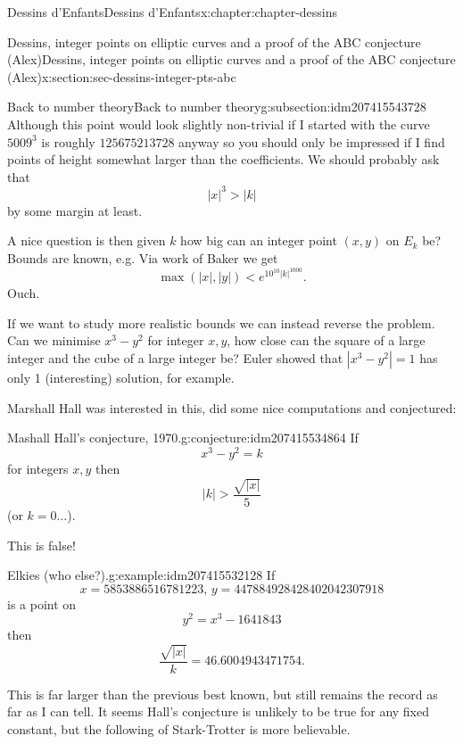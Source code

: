 \documentclass[oneside,10pt,]{book}
\numberwithin{equation}{section}
\newcommand{\lt}{<}
\newcommand{\gt}{>}
\begin{document}
\begin{chapterptx}{Dessins d'Enfants}{}{Dessins d'Enfants}{}{}{x:chapter:chapter-dessins}
\begin{sectionptx}{Dessins, integer points on elliptic curves and a proof of the ABC conjecture (Alex)}{}{Dessins, integer points on elliptic curves and a proof of the ABC conjecture (Alex)}{}{}{x:section:sec-dessins-integer-pts-abc}
\begin{subsectionptx}{Back to number theory}{}{Back to number theory}{}{}{g:subsection:idm207415543728}
Although this point would look slightly non-trivial if I started with the curve \(5009^3\) is roughly \(125675213728\) anyway so you should only be impressed if I find points of height somewhat larger than the coefficients. We should probably ask that%
\begin{equation*}
|x|^3 \gt |k|
\end{equation*}
by some margin at least.%
\par
A nice question is then given \(k\) how big can an integer point \((x,y)\) on \(E_k\) be? Bounds are known, e.g.  Via work of Baker we get%
\begin{equation*}
\max(|x|, |y|) \lt e^{10^{10}|k|^{1000}}\text{.}
\end{equation*}
Ouch.%
\par
If we want to study more realistic bounds we can instead reverse the problem. Can we minimise \(x^3 - y^2\) for integer \(x,y\), how close can the square of a large integer and the cube of a large integer be? Euler showed that \(|x^3 - y^2| = 1\) has only 1 (interesting) solution, for example.%
\par
Marshall Hall was interested in this, did some nice computations and conjectured:%
\begin{conjecture}{Mashall Hall's conjecture, 1970.}{}{g:conjecture:idm207415534864}%
If%
\begin{equation*}
x^3 - y^2 = k
\end{equation*}
for integers \(x,y\) then%
\begin{equation*}
|k| \gt \frac{\sqrt{|x|}}{5}
\end{equation*}
(or \(k =0\)...).%
\end{conjecture}
This is false!%
\begin{example}{Elkies (who else?).}{g:example:idm207415532128}%
If%
\begin{equation*}
x= 5853886516781223,\,y = 447884928428402042307918
\end{equation*}
is a point on%
\begin{equation*}
y^2 = x^3 - 1641843
\end{equation*}
then%
\begin{equation*}
\frac{\sqrt{|x|}}{k} = 46.6004943471754\text{.}
\end{equation*}
%
\end{example}
This is far larger than the previous best known, but still remains the record as far as I can tell. It seems Hall's conjecture is unlikely to be true for any fixed constant, but the following of Stark-Trotter is more believable.%

\end{subsectionptx}
\end{sectionptx}
\end{chapterptx}
\end{document}
